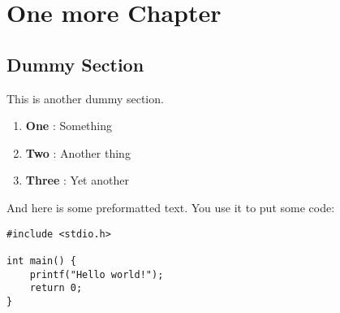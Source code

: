 

\chapter{One more Chapter}
\label{again_chapter}
\section{Dummy Section}

This is another dummy section.
\begin{enumerate}
	\item \textbf{One} : Something
	\item \textbf{Two} : Another thing
	\item \textbf{Three} : Yet another
\end{enumerate}


And here is some preformatted text. You use it to put some code:

\begin{Verbatim}[fontsize=\small]
#include <stdio.h>

int main() {
	printf("Hello world!");
	return 0;
}
\end{Verbatim}

